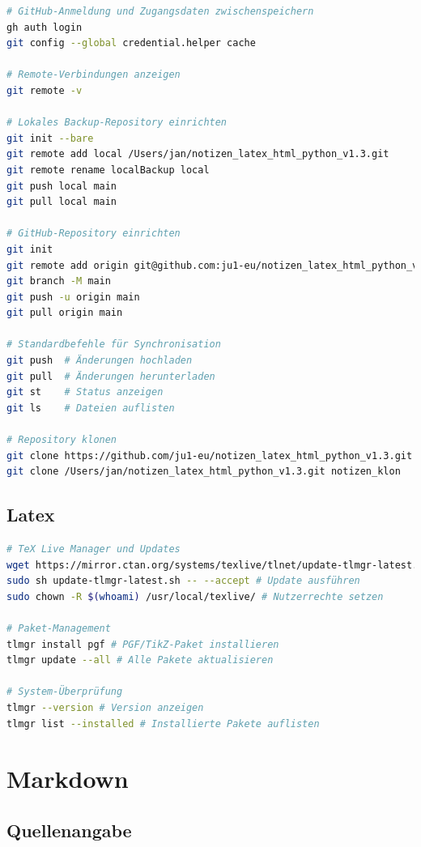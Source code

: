 \documentclass{content/vorlage-design-main}
\begin{document}
\begin{lstlisting}[language=bash]
# GitHub-Anmeldung und Zugangsdaten zwischenspeichern
gh auth login
git config --global credential.helper cache

# Remote-Verbindungen anzeigen
git remote -v

# Lokales Backup-Repository einrichten
git init --bare
git remote add local /Users/jan/notizen_latex_html_python_v1.3.git
git remote rename localBackup local
git push local main
git pull local main

# GitHub-Repository einrichten
git init
git remote add origin git@github.com:ju1-eu/notizen_latex_html_python_v1.3.git
git branch -M main
git push -u origin main
git pull origin main

# Standardbefehle für Synchronisation
git push  # Änderungen hochladen
git pull  # Änderungen herunterladen
git st    # Status anzeigen
git ls    # Dateien auflisten

# Repository klonen
git clone https://github.com/ju1-eu/notizen_latex_html_python_v1.3.git
git clone /Users/jan/notizen_latex_html_python_v1.3.git notizen_klon
\end{lstlisting}

\subsection{Latex}\label{latex}

\begin{lstlisting}[language=bash]
# TeX Live Manager und Updates
wget https://mirror.ctan.org/systems/texlive/tlnet/update-tlmgr-latest.sh # Manager herunterladen
sudo sh update-tlmgr-latest.sh -- --accept # Update ausführen
sudo chown -R $(whoami) /usr/local/texlive/ # Nutzerrechte setzen

# Paket-Management
tlmgr install pgf # PGF/TikZ-Paket installieren
tlmgr update --all # Alle Pakete aktualisieren

# System-Überprüfung
tlmgr --version # Version anzeigen
tlmgr list --installed # Installierte Pakete auflisten
\end{lstlisting}

\section{Markdown}\label{markdown}

\subsection{Quellenangabe}\label{quellenangabe}
\end{document}
